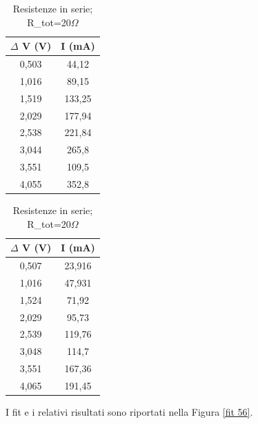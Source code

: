 \begin{table}[H]
\parbox{.45\linewidth}{
    \centering
    \begin{tabular}{cc}
    \toprule
    $\Delta$ V (V)  & I (mA) \\
    \midrule
    0,503	&44,12\\
1,016	&89,15\\
1,519	&133,25\\
2,029	&177,94\\
2,538	&221,84\\
3,044	&265,8\\
3,551	&109,5\\
4,055	&352,8\\
    \bottomrule
    \end{tabular}
    \caption{Resistenze in parallelo; R_{tot}=5$\Omega$}
    \label{tab:my_label}
    }
    \quad
    \parbox{.45\linewidth}{
    \centering
    \begin{tabular}{cc}
    \toprule
    $\Delta$ V (V)  & I (mA) \\
    \midrule
    0,507	&23,916\\
1,016	&47,931\\
1,524	&71,92\\
2,029	&95,73\\
2,539	&119,76\\
3,048	&114,7\\
3,551	&167,36\\
4,065	&191,45\\
    \bottomrule
    \end{tabular}
    \caption{Resistenze in serie; R_{tot}=20$\Omega$}
    \label{tab:my_label}
    }
\end{table}
\noindent
I fit e i relativi risultati sono riportati nella Figura \ref{fit 56}.
